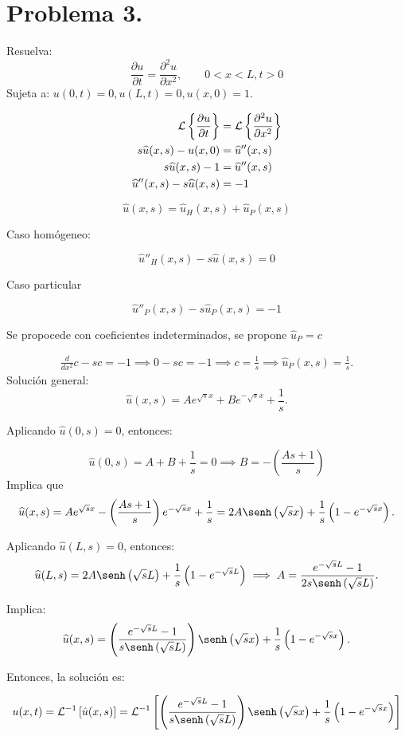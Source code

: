 \section{Problema 3.}  Resuelva: 
$$\frac{\partial u}{\partial t}=\frac{\partial ^2 u}{\partial x^2}, \qquad 0<x<L, t>0$$
Sujeta a: $u(0,t)=0, u(L,t)=0, u(x,0)=1$.
\begin{solution}
\begin{align*}
	\mathcal{L}\left\{\frac{\partial u}{\partial t}\right\}&=\mathcal{L}\left\{\frac{\partial ^2 u}{\partial x^2}\right\}\\
	s\widehat{u}(x,s)-u(x,0) &= \widehat{u}''(x,s)\\
		s\widehat{u}(x,s)-1&= \widehat{u}''(x,s)\\
		 \widehat{u}''(x,s)- s\widehat{u}(x,s)&= -1
\end{align*}

\linea 

$$\widehat{u}(x,s)=\widehat{u}_H(x,s)+\widehat{u}_P(x,s)$$

\linea 

Caso homógeneo:

$$\widehat{u}''_H(x,s)-s\widehat{u}(x,s)=0$$

\linea 

Caso particular 

$$\widehat{u}''_P(x,s)-s\widehat{u}_P(x,s)=-1$$

Se propocede con coeficientes indeterminados, se propone $\widehat{u}_P=c$

\begin{align*}
	\frac{d}{dx^2}c-sc=-1 \implies 0-sc=-1\implies c=\frac{1}{s}\implies \widehat{u}_P(x,s)=\frac{1}{s}.
\end{align*}
Solución general: 
$$\widehat{u}(x,s)=Ae^{\sqrt{s}x}+Be^{-\sqrt{s}x}+\frac{1}{s}.$$

Aplicando $\widehat{u}(0,s)=0$, entonces: 

$$\widehat{u}(0,s)=A+B+\frac{1}{s}=0\implies B= -\left(\frac{As+1}{s}\right)$$
Implica que 
$$\widehat{u}(x,s)=Ae^{\sqrt{s}x}-\left(\frac{As+1}{s}\right)e^{-\sqrt{s}x}+\frac{1}{s}=2A\senh\left(\sqrt{s}x\right)+\frac{1}{s}\left(1-e^{-\sqrt{s}x}\right).$$

Aplicando $\widehat{u}(L,s)=0$, entonces: 
$$\widehat{u}(L,s)=2A\senh\left(\sqrt{s}L\right)+\frac{1}{s}\left(1-e^{-\sqrt{s}L}\right)\implies A=\frac{e^{-\sqrt{s}L}-1}{2s\senh\left(\sqrt{s}L\right)}.$$

Implica: 
$$\widehat{u}(x,s)=\left(\frac{e^{-\sqrt{s}L}-1}{s\senh\left(\sqrt{s}L\right)}\right)\senh\left(\sqrt{s}x\right)+\frac{1}{s}\left(1-e^{-\sqrt{s}x}\right).$$

Entonces, la solución es: 

$$u(x,t)=\iLaplace{\hat{u}(x,s)}=\iLaplace{\left(\frac{e^{-\sqrt{s}L}-1}{s\senh\left(\sqrt{s}L\right)}\right)\senh\left(\sqrt{s}x\right)+\frac{1}{s}\left(1-e^{-\sqrt{s}x}\right)}$$


\end{solution}